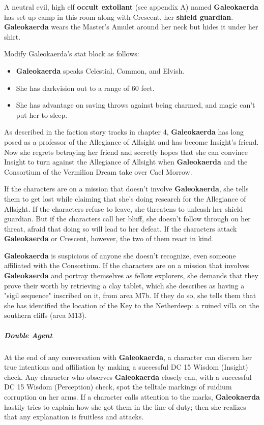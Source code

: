 \documentclass[10pt,a4paper,twoside,bg=print,twocolumn,openany,nodeprecatedcode]{dndbook}
\begin{document}
A neutral evil, high elf \textbf{occult extollant} (see appendix A) named \textbf{Galeokaerda} has set up camp in this room along with Crescent, her \textbf{shield guardian}. \textbf{Galeokaerda} wears the Master's Amulet around her neck but hides it under her shirt.

Modify Galeokaerda's stat block as follows:


\begin{itemize}
\item \textbf{Galeokaerda} speaks Celestial, Common, and Elvish.
\item She has darkvision out to a range of 60 feet.
\item She has advantage on saving throws against being charmed, and magic can't put her to sleep.
\end{itemize}

As described in the faction story tracks in chapter 4, \textbf{Galeokaerda} has long posed as a professor of the Allegiance of Allsight and has become Insight's friend. Now she regrets betraying her friend and secretly hopes that she can convince Insight to turn against the Allegiance of Allsight when \textbf{Galeokaerda} and the Consortium of the Vermilion Dream take over Cael Morrow.

If the characters are on a mission that doesn't involve \textbf{Galeokaerda}, she tells them to get lost while claiming that she's doing research for the Allegiance of Allsight. If the characters refuse to leave, she threatens to unleash her shield guardian. But if the characters call her bluff, she doesn't follow through on her threat, afraid that doing so will lead to her defeat. If the characters attack \textbf{Galeokaerda} or Crescent, however, the two of them react in kind.

\textbf{Galeokaerda} is suspicious of anyone she doesn't recognize, even someone affiliated with the Consortium. If the characters are on a mission that involves \textbf{Galeokaerda} and portray themselves as fellow explorers, she demands that they prove their worth by retrieving a clay tablet, which she describes as having a "sigil sequence" inscribed on it, from area M7b. If they do so, she tells them that she has identified the location of the Key to the Netherdeep: a ruined villa on the southern cliffs (area M13).

\subparagraph{Double Agent}
At the end of any conversation with \textbf{Galeokaerda}, a character can discern her true intentions and affiliation by making a successful DC 15 Wisdom (Insight) check. Any character who observes \textbf{Galeokaerda} closely can, with a successful DC 15 Wisdom (Perception) check, spot the telltale markings of ruidium corruption on her arms. If a character calls attention to the marks, \textbf{Galeokaerda} hastily tries to explain how she got them in the line of duty; then she realizes that any explanation is fruitless and attacks.
\end{document}
